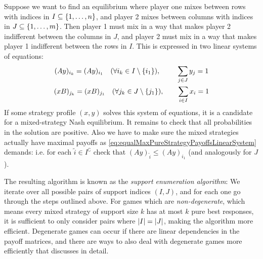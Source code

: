 \documentclass[a4paper]{scrreprt}
\begin{document}
    Suppose we want to find an equilibrium where player one mixes between rows with indices in $I \subseteq \{1, \dots, n\}$, and player 2 mixes between columns with indices in $J \subseteq \{1, \dots, m\}$. Then player 1 must mix in a way that makes player 2 indifferent between the columns in $J$, and player 2 must mix in a way that makes player 1 indifferent between the rows in $I$.
    This is expressed in two linear systems of equations:
    \begin{gather}
        (Ay)_{i_k} = (Ay)_{i_1} ~~~(\forall i_k \in I \setminus\{i_1\}), \qquad\;\, \sum_{j \in J} y_j = 1 \\
        (xB)_{j_k} = (xB)_{j_1} ~~~(\forall j_k \in J \setminus\{j_1\}), \qquad \sum_{i \in I} x_i = 1
    \end{gather}
    If some strategy profile $(x, y)$ solves this system of equations, it is a candidate for a mixed-strategy Nash equilibrium.
    It remains to check that all probabilities in the solution are positive. Also we have to make sure the mixed strategies actually have maximal payoffs as \eqref{eq:equalMaxPureStrategyPayoffsLinearSystem} demands: i.e. for each $\tilde{i}\in I^\complement$ check that $(Ay)_{\tilde{i}} \leq (Ay)_{i_1}$ (and analogously for $J$).
    
    The resulting algorithm is known as the \emph{support enumeration algorithm}: We iterate over all possible pairs of support indices $(I, J)$, and for each one go through the steps outlined above. For games which are \emph{non-degenerate}, which means every mixed strategy of support size $k$ has at most $k$ pure best responses, it is sufficient to only consider pairs where $\left| I \right| = \left| J \right|$, making the algorithm more efficient. Degenerate games can occur if there are linear dependencies in the payoff matrices, and there are ways to also deal with degenerate games more efficiently that \cite[p.65]{bib:nisanAlgorithmicGameTheoryCh3EquilibriumComputation} discusses in detail.
    
\end{document}
